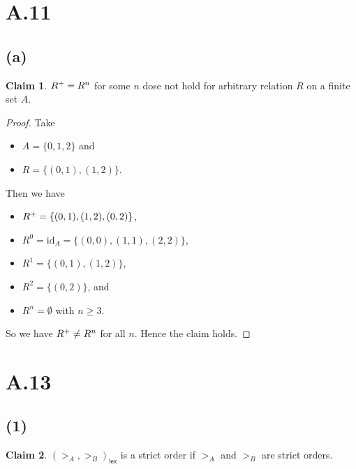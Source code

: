 \documentclass[autodetect-enginem]{article}
\theoremstyle{plain}
\theoremstyle{definition}
\theoremstyle{definition}
\newtheorem*{claim}{Claim}
\begin{document}
\section*{A.11}
\subsection*{(a)}

\begin{claim}
    $R^{+} = R^{n}$ for some $n$ dose not hold for arbitrary relation $R$ on a finite set $A$.
\end{claim}

\begin{proof}
    Take
    \begin{itemize}
        \item $A = \{0,1,2\}$ and
        \item $R = \{(0,1), (1,2)\}$.
    \end{itemize}

    Then we have
    \begin{itemize}
        \item $R^{+} = \{(0,1),(1,2),(0,2)\}$,
        \item $R^0 = \mathrm{id}_A = \{(0,0), (1,1), (2,2)\}$,
        \item $R^1 = \{(0,1), (1,2)\}$,
        \item $R^2 = \{(0,2)\}$, and
        \item $R^n = \emptyset$ with $n \geq 3$.
    \end{itemize}
    So we have $R^{+} \neq R^n$ for all $n$.
    Hence the claim holds.
\end{proof}

\section*{A.13}
\subsection*{(1)}
\newcommand{\lex}{(>_A, >_B)_{\mathsf{lex}}}
\begin{claim}
    $(>_A, >_B)_{\mathsf{lex}}$ is a strict order if $>_A$ and $>_B$ are strict orders.
\end{claim}
\end{document}
